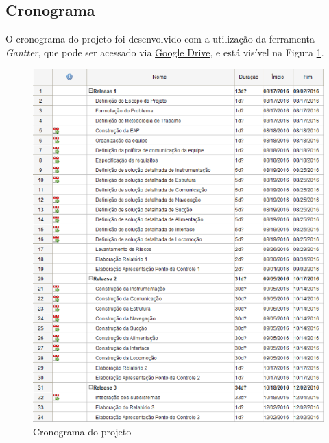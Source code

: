 	\subsection{Cronograma} %
	\label{sub:cronograma}
		
		O cronograma do projeto foi desenvolvido com a utilização da ferramenta \textit{Gantter}, que pode ser acessado via \href{https://www.smartapp.com/gantterforgoogledrive/index.html?fileID=0B7s5Po6PeeDMV2RhY2dWVEUtTUU#}{Google Drive}, e está visível na Figura \ref{img:cronograma}.

		\begin{figure}[H]
			\centering
			\includegraphics[scale=0.8]{figuras/cronograma.png}
			\caption{Cronograma do projeto}
			\label{img:cronograma}
		\end{figure}
